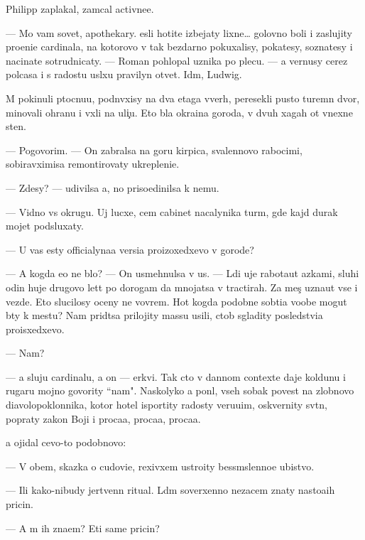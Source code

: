 \documentclass[10pt]{book}
\begin{document}
Philipp zaplakal, zam{\yi}cal activne{\y}e.

— Mo{\y} vam sovet, apothekary. {\Y}esli hotite izbejaty lixne{\y}… golovno{\y} boli i zaslujity pro{\x}eni{\y}e cardinala, na kotorovo v{\yi} tak bezdarno pokuxalisy, poka{\y}tesy, sozna{\y}tesy i nacina{\y}te sotrudnicaty. — Roman pohlopal uznika po plecu. — {\Y}a vernusy cerez polcasa i s radost{\y}u usl{\yi}xu pravilyn{\yi}{\y} otvet. Id{\e}m, Ludwig.

M{\yi} pokinuli p{\yi}tocnu{\y}u, podn{\ia}vxisy na dva etaga vverh, peresekli pusto{\y} turemn{\yi}{\y} dvor, minovali ohranu i v{\yi}xli na uli{\c}u. Eto b{\yi}la okra{\y}ina goroda, v dvuh xagah ot vnexne{\y} sten{\yi}.

— Pogovorim. — On zabralsa na goru kirpica, svalennovo rabocimi, sobiravximisa remontirovaty ukrepleni{\y}e.

— Zdesy? — udivilsa {\y}a, no priso{\y}edinilsa k nemu.

— Vidno vs{\io} okrugu. Uj lucxe, cem cabinet nacalynika turm{\yi}, gde kajd{\yi}{\y} durak mojet podsluxaty.

— U vas {\y}esty officialyna{\y}a versi{\y}a proizoxedxevo v gorode?

— A kogda {\y}e{\y}o ne b{\yi}lo? — On usmehnulsa v us{\yi}. — L{\io}di uje rabota{\y}ut {\y}az{\yi}kami, sluhi odin huje drugovo let{\ia}t po dorogam da mnojatsa v tractirah. Za mes{\ia}{\c} uzna{\y}ut vse i vezde. Eto slucilosy oceny ne vovrem{\ia}. Hot{\ia} kogda podobn{\yi}{\y}e sob{\yi}ti{\y}a voob{\x}e mogut b{\yi}ty k mestu? Nam prid{\e}tsa prilojity massu usili{\y}, ctob{\yi} sgladity posledstvi{\y}a proisxedxevo.

— Nam?

— {\Y}a sluju cardinalu, a on — {\C}erkvi. Tak cto v dannom contexte daje koldunu i rugaru mojno govority ``nam". Naskolyko {\y}a pon{\ia}l, vseh sobak poves{\ia}t na zlobnovo diavolopoklonnika, kotor{\yi}{\y} hotel isportity radosty veru{\y}u{\x}im, oskvernity sv{\ia}t{\yi}n{\io}, popraty zakon{\yi} Boj{\yf}i i proca{\y}a, proca{\y}a, proca{\y}a.

{\Y}a ojidal cevo-to podobnovo:

— V ob{\x}em, skazka o cudovi{\x}e, rexivxem ustro{\y}ity bessm{\yi}slenno{\y}e ubi{\y}stvo.

— Ili kako{\y}-nibudy jertvenn{\yi}{\y} ritual. L{\io}d{\ia}m soverxenno nezacem znaty nasto{\y}a{\x}ih pricin.

— A m{\yi} ih zna{\y}em? Eti sam{\yi}{\y}e pricin{\yi}?
\end{document}
